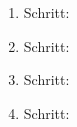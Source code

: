 \begin{enumerate}[label=\arabic*.]
    \begin{enumerate}[label=\arabic*.)]
        \item Schritt: \underline{\hspace{8cm}}
        \vspace{0.5cm}

        \item Schritt: \underline{\hspace{8cm}}
        \vspace{0.5cm}

        \item Schritt: \underline{\hspace{8cm}}
        \vspace{0.5cm}

        \item Schritt: \underline{\hspace{8cm}}
        \vspace{0.5cm}
    \end{enumerate}

\end{enumerate}